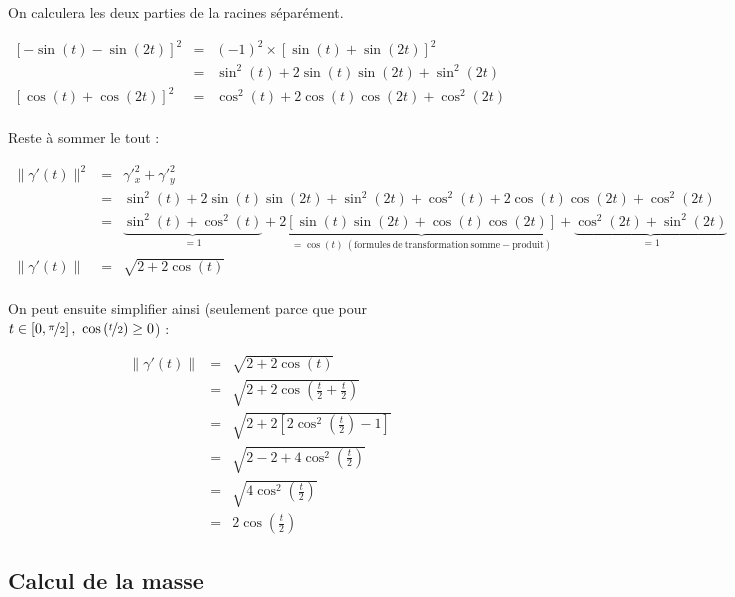 \documentclass[a4paper, 11pt]{report} %
\begin{document}
On calculera les deux parties de la racines séparément.

\begin{eqnarray*}
    \left[-\sin(t)-\sin(2t)\right]^2 & = & (-1)^2\times\left[\sin(t)+\sin(2t)\right]^2\\
                                    & = & \sin^2(t)+2\sin(t)\sin(2t)+\sin^2(2t)\\
    \left[\cos(t)+\cos(2t)\right]^2 & = & \cos^2(t)+2\cos(t)\cos(2t)+\cos^2(2t)\\
\end{eqnarray*}


Reste à sommer le tout :

\begin{eqnarray*}
    \lVert\gamma'(t)\rVert^2 & = & \gamma'^2_x + \gamma'^2_y\\
    & = & \sin^2(t)+2\sin(t)\sin(2t)+\sin^2(2t) + \cos^2(t)+2\cos(t)\cos(2t)+\cos^2(2t)\\
    & = & \underbrace{\sin^2(t) + \cos^2(t)}_{=1} + 2\underbrace{\left[\sin(t)\sin(2t) +\cos(t)\cos(2t)\right]}_{=\cos(t)\mathrm{~(formules~de~transformation~somme-produit)}}+\underbrace{\cos^2(2t)+\sin^2(2t)}_{=1}\\
    \lVert\gamma'(t)\rVert & = &\sqrt{2+2\cos(t)}\\
\end{eqnarray*}

On peut ensuite simplifier ainsi (seulement parce que pour $t\in\left[0,\nicefrac{\pi}{2}\right],~\cos\left(\nicefrac{t}{2}\right) \geq 0$) :

\begin{eqnarray*}
    \lVert\gamma'(t)\rVert & = & \sqrt{2+2\cos(t)}\\
                           & = & \sqrt{2 + 2\cos\left(\frac{t}{2} +\frac{t}{2} \right)}\\
                           & = & \sqrt{2 + 2\left[2\cos^2\left(\frac{t}{2}\right)-1\right]}\\
                           & = & \sqrt{2 - 2 + 4\cos^2\left(\frac{t}{2}\right)}\\
                           & = & \sqrt{4\cos^2\left(\frac{t}{2}\right)}\\
                           & = & 2\cos\left(\frac{t}{2}\right)
\end{eqnarray*}


\subsection{Calcul de la masse} %
\end{document}
